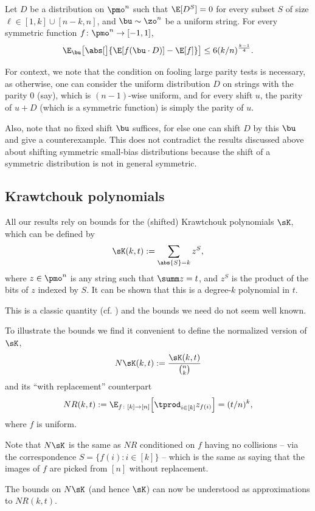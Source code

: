 \begin{theorem} \label{thm:improve-Bazzi}
Let $D$ be a distribution on $\pmo^n$ such that $\E[D^S] = 0$ for every subset $S$ of size $\ell \in [1,k] \cup [n-k,n]$, and $\bu \sim \zo^n$ be a uniform string.
For every symmetric function $f\colon\pmo^n \to [-1,1]$,
  \[
    \E_{\bu}\bigl[ \abs[\big]{ \E[f(\bu \cdot D)] - \E[f] } \bigr]
    \le 6 (k/n)^{\frac{k-1}{4}} .
  \]
\end{theorem}

For context, we note that the condition on fooling large parity tests is necessary, as otherwise, one can consider the uniform distribution $D$ on strings with the parity $0$ (say), which is $(n-1)$-wise uniform, and for every shift $u$, the parity of $u+D$ (which is a symmetric function) is simply the parity of $u$.

Also, note that no fixed shift $\bu$ suffices, for else one can shift $D$ by this $\bu$ and give a counterexample.  This does not contradict the results discussed above about shifting symmetric small-bias distributions because the shift of a symmetric distribution is not in general symmetric.

\subsection{Krawtchouk polynomials}
All our results rely on bounds for the (shifted) Krawtchouk polynomials $\sK$, which can be defined by
\[
  \sK(k,t) := \sum_{\abs{S} = k} z^S ,
  \]
  where $z \in \pmo^n$ is any string such that $\summ z=t$, and $z^S$ is the product of the bits of $z$ indexed by $S$.
It can be shown that this is a degree-$k$ polynomial in $t$.

This is a classic quantity (cf. \cite{KL01}) and the bounds we need do not seem well known.

To illustrate the bounds we find it convenient to define the normalized version of $\sK$,
\[
  N \sK(k,t) := \frac{\sK(k,t)}{\binom{n}{k}}
\]
and its ``with replacement'' counterpart
\[
  NR(k,t):=\E_{f\colon[k]\to[n]}\Bigl[\tprod_{i\in[k]} z_{f(i)}\Bigr] = (t/n)^k,
\]
where $f$ is uniform.

Note that $N \sK$ is the same as $NR$ conditioned on $f$ having no collisions -- via the correspondence $S=\{f(i):i\in[k]\}$ -- which is the same as saying that the images of $f$ are picked from $[n]$ without replacement.

The bounds on $N \sK$ (and hence $\sK$) can now be understood as approximations to $NR(k,t)$.

